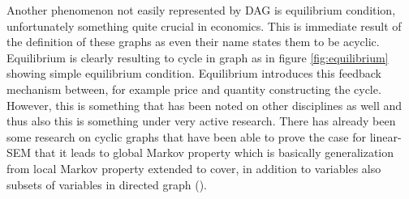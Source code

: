 \documentclass[main=english,12pt,a4paper,pdftex,econ,utf8]{aaltothesis}
\begin{document}
\begin{comment}
Economic theory being the factor that is in a way differing it from other kind of more general statistics inclined towards social phenomenons and the framework through which it is possible to even study the causal structures as those need the substantive knowledge of topic to have even possibility to be interpreted as CI at all. 
\end{comment}



Another phenomenon not easily represented by DAG is equilibrium condition, unfortunately something quite crucial in economics. This is immediate result of the definition of these graphs as even their name states them to be acyclic. Equilibrium is clearly resulting to cycle in graph as in figure \ref{fig:equilibrium} showing simple equilibrium condition. Equilibrium introduces this feedback mechanism between, for example price and quantity constructing the cycle. 
However, this is something that has been noted on other disciplines as well and thus also this is something under very active research. There has already been some research on cyclic graphs that have been able to prove the case for linear-SEM that it leads to global Markov property which is basically generalization from local Markov property extended to cover, in addition to variables also subsets of variables in directed graph (\cite{PeterSpirtes1994}).
\end{document}
